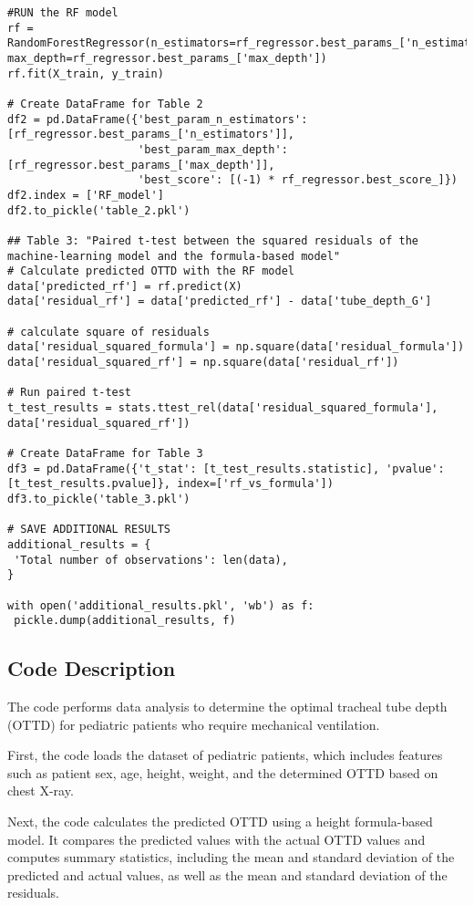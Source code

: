 \documentclass[11pt]{article}
\begin{document}
\begin{verbatim}
#RUN the RF model
rf = RandomForestRegressor(n_estimators=rf_regressor.best_params_['n_estimators'], max_depth=rf_regressor.best_params_['max_depth'])
rf.fit(X_train, y_train)

# Create DataFrame for Table 2
df2 = pd.DataFrame({'best_param_n_estimators': [rf_regressor.best_params_['n_estimators']],
                    'best_param_max_depth': [rf_regressor.best_params_['max_depth']],
                    'best_score': [(-1) * rf_regressor.best_score_]})
df2.index = ['RF_model']
df2.to_pickle('table_2.pkl')

## Table 3: "Paired t-test between the squared residuals of the machine-learning model and the formula-based model"
# Calculate predicted OTTD with the RF model
data['predicted_rf'] = rf.predict(X)
data['residual_rf'] = data['predicted_rf'] - data['tube_depth_G']

# calculate square of residuals
data['residual_squared_formula'] = np.square(data['residual_formula'])
data['residual_squared_rf'] = np.square(data['residual_rf'])

# Run paired t-test
t_test_results = stats.ttest_rel(data['residual_squared_formula'], data['residual_squared_rf'])

# Create DataFrame for Table 3
df3 = pd.DataFrame({'t_stat': [t_test_results.statistic], 'pvalue': [t_test_results.pvalue]}, index=['rf_vs_formula'])
df3.to_pickle('table_3.pkl')

# SAVE ADDITIONAL RESULTS
additional_results = {
 'Total number of observations': len(data),
}

with open('additional_results.pkl', 'wb') as f:
 pickle.dump(additional_results, f)

\end{verbatim}

\subsection{Code Description}

The code performs data analysis to determine the optimal tracheal tube depth (OTTD) for pediatric patients who require mechanical ventilation. 

First, the code loads the dataset of pediatric patients, which includes features such as patient sex, age, height, weight, and the determined OTTD based on chest X-ray.

Next, the code calculates the predicted OTTD using a height formula-based model. It compares the predicted values with the actual OTTD values and computes summary statistics, including the mean and standard deviation of the predicted and actual values, as well as the mean and standard deviation of the residuals.
\end{document}
